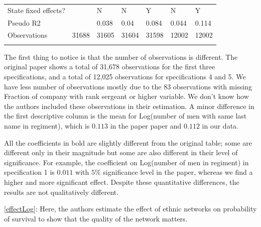 \documentclass{article}
\begin{document}
\begin{table}
\begin{tabular}{lllllll}
State fixed effects?                               &        & N       & N       & Y       & N                                   & Y \\
Pseudo R2                                          &        & 0.038   & 0.04    & 0.084   & 0.044                               & 0.114 \\
Observations                                       & 31688  & 31605   & 31604   & 31598   & 12002                               & 12002 \\
                                                   &        &         &         &         &                                     &  \\
\end{tabular}
\end{table}

The first thing to notice is that the number of observations is different. The original paper shows a total of 31,678 observations for the first three specifications, and a total of 12,025 observations for specifications 4 and 5. We have less number of observations mostly due to the 83 observations with missing Fraction of company with rank sergeant or higher variable. We don’t know how the authors included these observations in their estimation.  A minor difference in the first descriptive column is the mean for Log(number of men with same last name in regiment), which is $0.113$ in the paper paper and $0.112$ in our data.

All the coefficients in bold are slightly different from the original table; some are different only in their magnitude but some are also different in their level of significance. For example, the coefficient on Log(number of men in regiment) in specification 1 is $0.011$ with $5\%$ significance level in the paper, whereas we find a higher and more significant effect. Despite these quantitative differences, the results are not qualitatively different.

\autoref{effectLog}: Here, the authors estimate the effect of ethnic networks on probability of survival to show that the quality of the network matters.
\end{document}
